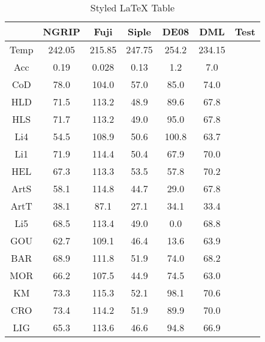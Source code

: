 \begin{table}[h]
\centering
\caption{Styled LaTeX Table}
\label{table:5}
\begin{tabular}{cccccc}
\toprule
 & NGRIP & Fuji & Siple & DE08 & DML & Test \\
\midrule
Temp & 242.05 & 215.85 & 247.75 & 254.2 & 234.15 \\
Acc & 0.19 & 0.028 & 0.13 & 1.2 & 7.0 \\
CoD & 78.0 & 104.0 & 57.0 & 85.0 & 74.0 \\
HLD & 71.5 & 113.2 & 48.9 & 89.6 & 67.8 \\
HLS & 71.7 & 113.2 & 49.0 & 95.0 & 67.8 \\
Li4 & 54.5 & 108.9 & 50.6 & 100.8 & 63.7 \\
Li1 & 71.9 & 114.4 & 50.4 & 67.9 & 70.0 \\
HEL & 67.3 & 113.3 & 53.5 & 57.8 & 70.2 \\
ArtS & 58.1 & 114.8 & 44.7 & 29.0 & 67.8 \\
ArtT & 38.1 & 87.1 & 27.1 & 34.1 & 33.4 \\
Li5 & 68.5 & 113.4 & 49.0 & 0.0 & 68.8 \\
GOU & 62.7 & 109.1 & 46.4 & 13.6 & 63.9 \\
BAR & 68.9 & 111.8 & 51.9 & 74.0 & 68.2 \\
MOR & 66.2 & 107.5 & 44.9 & 74.5 & 63.0 \\
KM & 73.3 & 115.3 & 52.1 & 98.1 & 70.6 \\
CRO & 73.4 & 114.2 & 51.9 & 89.9 & 70.0 \\
LIG & 65.3 & 113.6 & 46.6 & 94.8 & 66.9 \\
\bottomrule
\end{tabular}
\end{table}
